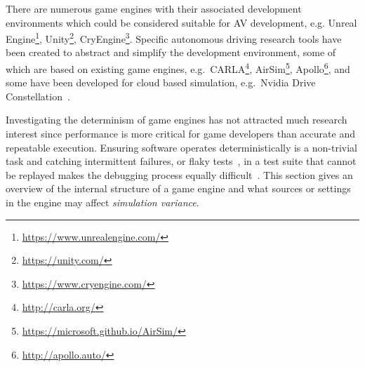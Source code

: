 \documentclass[letterpaper, 10 pt, journal, twoside]{IEEEtran}
\begin{document}
There are numerous game engines with their associated development environments which could be considered suitable for AV development, e.g. Unreal Engine\footnote{\url{https://www.unrealengine.com/}}, Unity\footnote{\url{https://unity.com/}}, CryEngine\footnote{\url{https://www.cryengine.com/}}. Specific autonomous driving research tools have been created to abstract and simplify the development environment, some of which are based on existing game engines, e.g.\ CARLA\footnote{\url{http://carla.org/}}, AirSim\footnote{\url{https://microsoft.github.io/AirSim/}}, Apollo\footnote{\url{http://apollo.auto/}}, and some have been developed for cloud based simulation, e.g.\ Nvidia Drive Constellation~\cite{nvidia_constellation}.

Investigating the determinism of game engines has not attracted much research interest since performance is more critical for game developers than accurate and repeatable execution.  %
%
Ensuring software operates deterministically is a non-trivial task and catching intermittent failures, or flaky tests~\cite{intermittently-failing-tests}, in a test suite that cannot be replayed makes the debugging process equally difficult~\cite{acm-q-rr-interview}.
%
%
%
This section gives an overview of the internal structure of a game engine and what sources or settings in the engine may affect \textit{simulation variance}.
%
\end{document}
